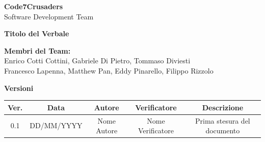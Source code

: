 \documentclass{article}
\begin{document}
\begin{titlepage}
    {\Huge \textbf{Code7Crusaders}}\\
    \vspace{0.5cm}
    {\Large Software Development Team}\\
    \vspace{2cm}
    
    {\large \textbf{Titolo del Verbale}}\\ %
    \vspace{5cm}                           %
    
    
    \textbf{Membri del Team:}\\
    Enrico Cotti Cottini, Gabriele Di Pietro, Tommaso Diviesti \\
    Francesco Lapenna, Matthew Pan, Eddy Pinarello, Filippo Rizzolo \\
    \vspace{0.5cm}
    
    \vspace{1cm}
\end{titlepage}



\newpage
\begin{table}[h!]
\centering
\textbf{Versioni} \\ %
\vspace{2mm} %
\begin{tabular}{|c|c|c|c|c|}
    \hline
    \textbf{Ver.} & \textbf{Data} & \textbf{Autore} & \textbf{Verificatore} & \textbf{Descrizione} \\
    \hline
    0.1 & DD/MM/YYYY & Nome Autore & Nome Verificatore & Prima stesura del documento \\ 
    \hline                                  %
\end{tabular}
\end{table}



\newpage
\tableofcontents
\end{document}
